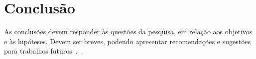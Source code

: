 \chapter{Conclusão}

As conclusões devem responder às questões da pesquisa, em relação aos objetivos e às hipóteses. Devem ser breves, podendo apresentar recomendações e sugestões para trabalhos futuros~\cite{HIBERNATE:2023,PMA:LEI-120-2006,ABNT:NBR-158841-2011,ABNT:NBR-7180-2016,PINTO2006}.~\cite{PINTO2006}.
